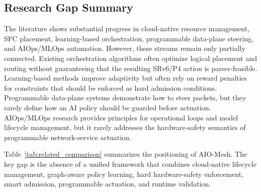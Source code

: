 \documentclass[final,5p]{elsarticle}
\begin{document}
\subsection{Research Gap Summary}
\label{subsec:related_gap}

The literature shows substantial progress in cloud-native resource management, SFC placement, learning-based orchestration, programmable data-plane steering, and AIOps/MLOps automation. However, these streams remain only partially connected. Existing orchestration algorithms often optimize logical placement and routing without guaranteeing that the resulting SRv6/P4 action is parser-feasible. Learning-based methods improve adaptivity but often rely on reward penalties for constraints that should be enforced as hard admission conditions. Programmable data-plane systems demonstrate how to steer packets, but they rarely define how an AI policy should be guarded before actuation. AIOps/MLOps research provides principles for operational loops and model lifecycle management, but it rarely addresses the hardware-safety semantics of programmable network-service actuation.

Table~\ref{tab:related_comparison} summarizes the positioning of AIO-Mesh. The key gap is the absence of a unified framework that combines cloud-native lifecycle management, graph-aware policy learning, hard hardware-safety enforcement, smart admission, programmable actuation, and runtime validation.
\end{document}
